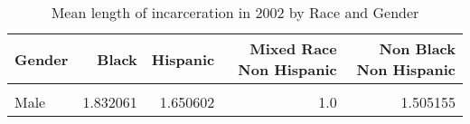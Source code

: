 \begin{table}[H]

\caption{\label{tab:tab:summarystats}Mean length of incarceration in 2002 by Race and Gender}
\centering
\begin{tabular}[t]{lrrrr}
\toprule
Gender & Black & Hispanic & Mixed Race Non Hispanic & Non Black Non Hispanic\\
\midrule
\cellcolor{gray!6}{Female} & \cellcolor{gray!6}{1.368421} & \cellcolor{gray!6}{1.166667} & \cellcolor{gray!6}{1.5} & \cellcolor{gray!6}{1.492754}\\
Male & 1.832061 & 1.650602 & 1.0 & 1.505155\\
\bottomrule
\end{tabular}
\end{table}
